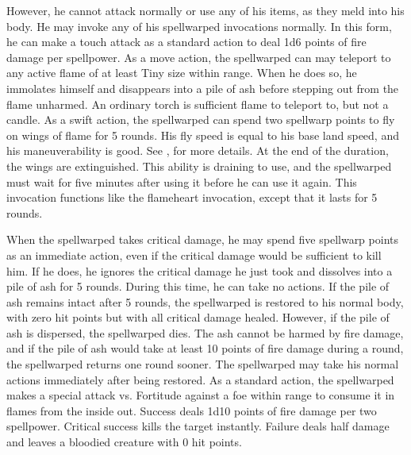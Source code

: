 However, he cannot attack normally or use any of his items, as they meld into his body.
He may invoke any of his spellwarped invocations normally.
In this form, he can make a touch attack as a standard action to deal 1d6 points of fire damage per spellpower.
As a move action, the spellwarped can may teleport to any active flame of at least Tiny size within \rngmed range.
When he does so, he immolates himself and disappears into a pile of ash before stepping out from the flame unharmed.
An ordinary torch is sufficient flame to teleport to, but not a candle.
As a swift action, the spellwarped can spend two spellwarp points to fly on wings of flame for 5 rounds.
His fly speed is equal to his base land speed, and his maneuverability is good.
See , for more details.
At the end of the duration, the wings are extinguished.
This ability is draining to use, and the spellwarped must wait for five minutes after using it before he can use it again.
This invocation functions like the flameheart invocation, except that it lasts for 5 rounds.

When the spellwarped takes critical damage, he may spend five spellwarp points as an immediate action, even if the critical damage would be sufficient to kill him.
If he does, he ignores the critical damage he just took and dissolves into a pile of ash for 5 rounds.
During this time, he can take no actions.
If the pile of ash remains intact after 5 rounds, the spellwarped is restored to his normal body, with zero hit points but with all critical damage healed.
However, if the pile of ash is dispersed, the spellwarped dies.
The ash cannot be harmed by fire damage, and if the pile of ash would take at least 10 points of fire damage during a round, the spellwarped returns one round sooner.
The spellwarped may take his normal actions immediately after being restored.
As a standard action, the spellwarped makes a special attack vs. Fortitude against a foe within \rngclose range to consume it in flames from the inside out.
Success deals 1d10 points of fire damage per two spellpower.
Critical success kills the target instantly.
Failure deals half damage and leaves a bloodied creature with 0 hit points.

